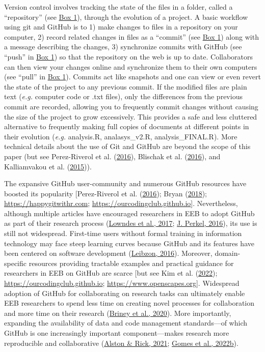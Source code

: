 Version control involves tracking the state of the files in a folder, called a ``repository'' (see \protect\hyperlink{definitions}{Box 1}), through the evolution of a project.
A basic workflow using git and GitHub is to 1) make changes to files in a repository on your computer, 2) record related changes in files as a ``commit'' (see \protect\hyperlink{definitions}{Box 1}) along with a message describing the changes, 3) synchronize commits with GitHub (see ``push'' in \protect\hyperlink{definitions}{Box 1}) so that the repository on the web is up to date.
Collaborators can then view your changes online and synchronize them to their own computers (see ``pull'' in \protect\hyperlink{definitions}{Box 1}).
Commits act like snapshots and one can view or even revert the state of the project to any previous commit.
If the modified files are plain text (\emph{e.g.} computer code or .txt files), only the differences from the previous commit are recorded, allowing you to frequently commit changes without causing the size of the project to grow excessively.
This provides a safe and less cluttered alternative to frequently making full copies of documents at different points in their evolution (\emph{e.g.} analysis.R, analasys\_v2.R, analysis\_FINAL.R).
More technical details about the use of Git and GitHub are beyond the scope of this paper (but see Perez-Riverol et al. (\protect\hyperlink{ref-kEX5dgzK}{2016}), Blischak et al. (\protect\hyperlink{ref-PlcxShQU}{2016}), and Kalliamvakou et al. (\protect\hyperlink{ref-ndfO9H}{2015})).

The expansive GitHub user-community and numerous GitHub resources have boosted its popularity {[}Perez-Riverol et al. (\protect\hyperlink{ref-kEX5dgzK}{2016}); Bryan (\protect\hyperlink{ref-RVetqmsg}{2018}); \url{https://happygitwithr.com}; \url{https://ourcodingclub.github.io}{]}.
Nevertheless, although multiple articles have encouraged researchers in EEB to adopt GitHub as part of their research process (\protect\hyperlink{ref-3DKwn1sY}{Lowndes et al., 2017}; \protect\hyperlink{ref-10ghgV3S8}{J. Perkel, 2016}), its use is still not widespread.
First-time users without formal training in information technology may face steep learning curves because GitHub and its features have been centered on software development (\protect\hyperlink{ref-139b0pSGc}{Leibzon, 2016}).
Moreover, domain-specific resources providing tractable examples and practical guidance for researchers in EEB on GitHub are scarce {[}but see Kim et al. (\protect\hyperlink{ref-lJAgyhYq}{2022}); \url{https://ourcodingclub.github.io}; \url{https://www.openscapes.org}{]}.
Widespread adoption of GitHub for collaborating on research tasks can ultimately enable EEB researchers to spend less time on creating novel processes for collaboration and more time on their research (\protect\hyperlink{ref-ydrk01SR}{Briney et al., 2020}).
More importantly, expanding the availability of data and code management standards---of which GitHub is one increasingly important component---makes research more reproducible and collaborative (\protect\hyperlink{ref-13QX8XU3J}{Alston \& Rick, 2021}; \protect\hyperlink{ref-pq2Tv1BC}{Gomes et al., 2022b}).

